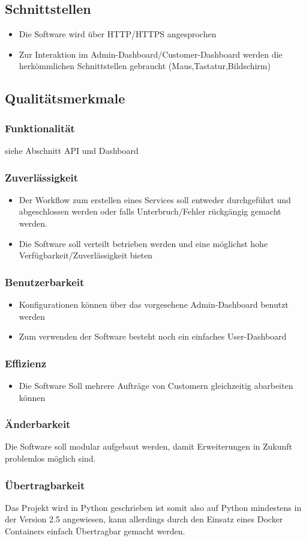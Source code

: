 \documentclass[11pt]{scrartcl}
\begin{document}
\subsection{Schnittstellen}
\begin{itemize}
  \item Die Software wird über HTTP/HTTPS angesprochen
  \item Zur Interaktion im Admin-Dashboard/Customer-Dashboard werden die herkömmlichen 
  Schnittstellen gebraucht (Maus,Tastatur,Bildschirm)
\end{itemize}
\subsection{Qualitätsmerkmale}
\subsubsection{Funktionalität}
siehe Abschnitt API und Dashboard
\subsubsection{Zuverlässigkeit}
\begin{itemize}
  \item Der Workflow zum erstellen eines Services soll entweder durchgeführt und 
  abgeschlossen werden oder falls Unterbruch/Fehler rückgängig gemacht 
  werden.
  \item Die Software soll verteilt betrieben werden und eine möglichst hohe 
  Verfügbarkeit/Zuverlässigkeit bieten
\end{itemize}
\subsubsection{Benutzerbarkeit}
\begin{itemize}
  \item Konfigurationen können über das vorgesehene Admin-Dashboard benutzt werden
  \item Zum verwenden der Software besteht noch ein einfaches 
  User-Dashboard
\end{itemize}
\subsubsection{Effizienz}
\begin{itemize}
  \item Die Software Soll mehrere Aufträge von Customern gleichzeitig abarbeiten können
\end{itemize}
\subsubsection{Änderbarkeit}
Die Software soll modular aufgebaut werden, damit Erweiterungen in Zukunft 
problemlos möglich sind.
\subsubsection{Übertragbarkeit}
Das Projekt wird in Python geschrieben ist somit also auf Python mindestens in der Version 2.5 angewiesen, 
kann allerdings durch den Einsatz eines Docker Containers einfach Übertragbar 
gemacht werden.
\end{document}
